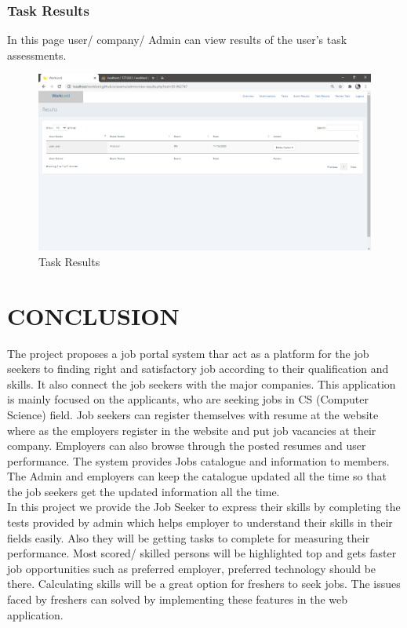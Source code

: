 \documentclass[a4paper,12pt]{report}
\begin{document}
\subsection {Task Results}
In this page user/ company/ Admin can view results of the user's task assessments.
\begin{figure}[bph]
	\centering
	\includegraphics[width=.7\linewidth ]{img/screenshots/exams_results_pre}
	\caption{Task Results}
\end{figure}


\pagebreak

\chapter{CONCLUSION}

The project  proposes a job portal system thar act as a platform for the job seekers to  finding right and satisfactory job according to their qualification and skills. It also connect the job seekers with the major companies. This application is mainly focused on the applicants, who are seeking jobs in CS (Computer Science) field. Job seekers can register themselves with resume at the website where as the employers register in the website and put job vacancies at their company. Employers can also browse through the posted resumes and user performance. The system provides Jobs catalogue and information to members. The Admin and employers can keep the catalogue updated all the time so that the job seekers get the updated information all the time.\\

In this project we provide the Job Seeker to express their skills by completing the tests provided by admin which helps employer to understand their skills in their fields easily. Also they will be getting tasks to complete for measuring their performance. Most scored/ skilled persons will be highlighted top and gets faster job opportunities such as preferred employer, preferred technology should be there. Calculating skills will be a great option for freshers to seek jobs. The issues faced by freshers can solved by implementing these features in the web application.
\end{document}
